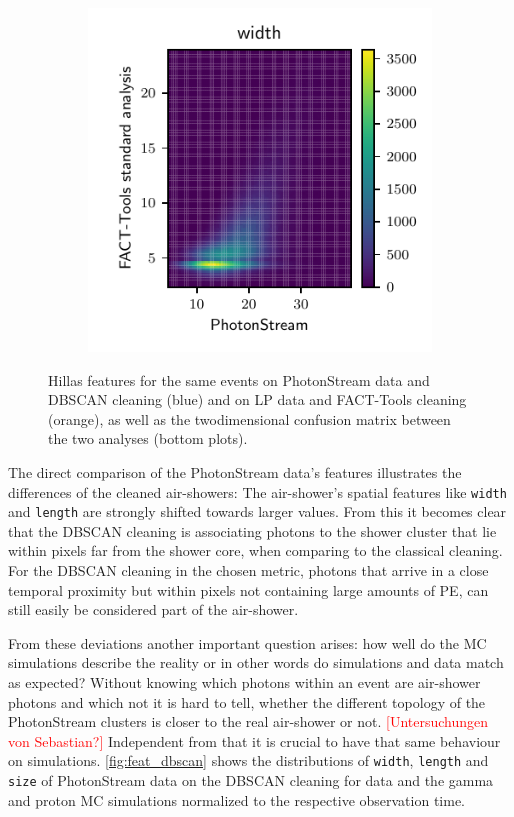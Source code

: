 \begin{figure}
\begin{subfigure}{0.5\textwidth}
  \end{subfigure}
  \begin{subfigure}{0.5\textwidth}
    \centering
    \includegraphics[width=\textwidth, page=2]{Plots/std_phs_comparison_DBSCAN_crab.pdf}
  \end{subfigure}
  \caption{Hillas features for the same events on PhotonStream data and DBSCAN cleaning (blue) and on LP data and FACT-Tools cleaning (orange), as well as the twodimensional confusion matrix between the two analyses (bottom plots).}
  \label{fig:feat_comp}
\end{figure}
%
The direct comparison of the PhotonStream data's features illustrates the
differences of the cleaned air-showers: The air-shower's spatial features like
\texttt{width} and \texttt{length} are strongly shifted towards larger values.
From this it becomes clear that the DBSCAN cleaning is associating photons to
the shower cluster that lie within pixels far from the shower core, when
comparing to the classical cleaning. For the DBSCAN cleaning in the chosen
metric, photons that arrive in a close temporal proximity but within pixels not
containing large amounts of PE, can still easily be considered part of the
air-shower.

From these deviations another important question arises: how well do the MC
simulations describe the reality or in other words do simulations and data
match as expected? Without knowing which photons within an event are air-shower
photons and which not it is hard to tell, whether the different topology of the
PhotonStream clusters is closer to the real air-shower or not.
\textcolor{red}{[Untersuchungen von Sebastian?]} Independent from that it is crucial to
have that same behaviour on simulations. \autoref{fig:feat_dbscan} shows the
distributions of \texttt{width}, \texttt{length} and \texttt{size} of
PhotonStream data on the DBSCAN cleaning for data and the gamma and proton MC
simulations normalized to the respective observation time.

